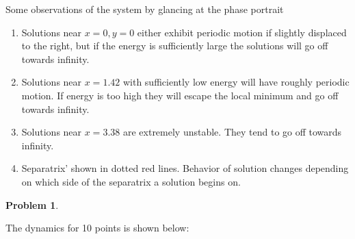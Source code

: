 \documentclass[12pt, a4paper]{article}
\newtheorem{problem}{Problem}
\theoremstyle{definition}
\begin{document}
Some observations of the system by glancing at the phase portrait
\begin{enumerate}
	\item Solutions near $x=0,y=0$ either exhibit periodic motion if slightly displaced to the right, but if the energy is sufficiently large the solutions will go off towards infinity. 
	\item Solutions near $x = 1.42$ with sufficiently low energy will have roughly periodic motion. If energy is too high they will escape the local minimum and go off towards infinity. 
	\item Solutions near $x = 3.38$ are extremely unstable. They tend to go off towards infinity. 
	\item Separatrix' shown in dotted red lines. Behavior of solution changes depending on which side of the separatrix a solution begins on. 
\end{enumerate}
\newpage
\begin{problem}
\end{problem}
The dynamics for 10 points is shown below:  
\end{document}
